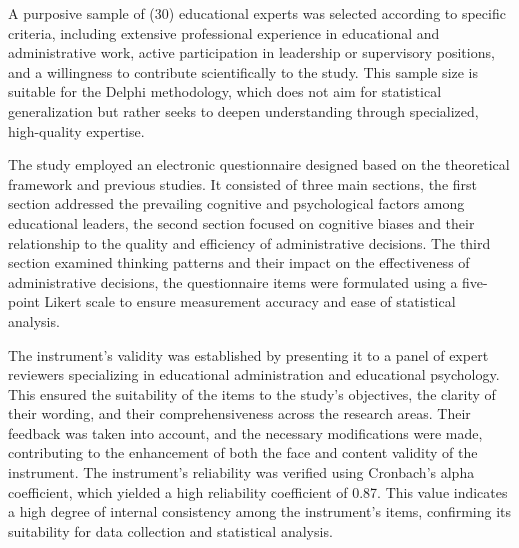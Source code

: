 \documentclass[10pt]{NSP1}
\begin{document}
\par\medskip{}\smallskip

A purposive sample of (30) educational experts was selected according to specific criteria, including extensive professional experience in educational and administrative work, active participation in leadership or supervisory positions, and a willingness to contribute scientifically to the study. This sample size is suitable for the Delphi methodology, which does not aim for statistical generalization but rather seeks to deepen understanding through specialized, high-quality expertise.

\par\medskip{}\smallskip

The study employed an electronic questionnaire designed based on the theoretical framework and previous studies. It consisted of three main sections, the first section addressed the prevailing cognitive and psychological factors among educational leaders, the second section focused on cognitive biases and their relationship to the quality and efficiency of administrative decisions. The third section examined thinking patterns and their impact on the effectiveness of administrative decisions, the questionnaire items were formulated using a five-point Likert scale to ensure measurement accuracy and ease of statistical analysis.

\par\medskip{}\smallskip

The instrument's validity was established by presenting it to a panel of expert reviewers specializing in educational administration and educational psychology. This ensured the suitability of the items to the study's objectives, the clarity of their wording, and their comprehensiveness across the research areas. Their feedback was taken into account, and the necessary modifications were made, contributing to the enhancement of both the face and content validity of the instrument. The instrument's reliability was verified using Cronbach's alpha coefficient, which yielded a high reliability coefficient of 0.87. This value indicates a high degree of internal consistency among the instrument's items, confirming its suitability for data collection and statistical analysis.
\end{document}
